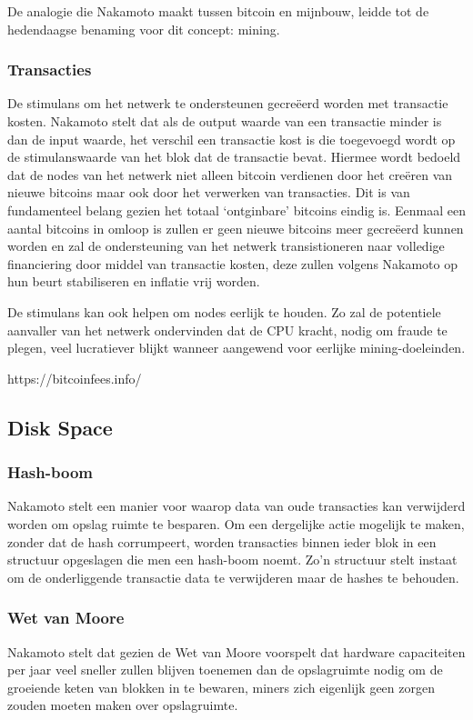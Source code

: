 		De analogie die Nakamoto maakt tussen bitcoin en mijnbouw, leidde tot de hedendaagse benaming voor dit concept: mining. 
		
		\subsubsection{Transacties}
		De stimulans om het netwerk te ondersteunen gecreëerd worden met transactie kosten. Nakamoto stelt dat als de output waarde van een transactie minder is dan de input waarde, het verschil een transactie kost is die toegevoegd wordt op de stimulanswaarde van het blok dat de transactie bevat. Hiermee wordt bedoeld dat de nodes van het netwerk niet alleen bitcoin verdienen door het creëren van nieuwe bitcoins maar ook door het verwerken van transacties. Dit is van fundamenteel belang gezien het totaal ‘ontginbare’ bitcoins eindig is. Eenmaal een aantal bitcoins in omloop is zullen er geen nieuwe bitcoins meer gecreëerd kunnen worden en zal de ondersteuning van het netwerk transistioneren naar volledige financiering door middel van transactie kosten, deze zullen volgens Nakamoto op hun beurt stabiliseren en inflatie vrij worden.
		
		De stimulans kan ook helpen om nodes eerlijk te houden. Zo zal de potentiele aanvaller van het netwerk ondervinden dat de CPU kracht, nodig om fraude te plegen, veel lucratiever blijkt wanneer aangewend voor eerlijke mining-doeleinden. 
		
		https://bitcoinfees.info/
		
	\subsection{Disk Space}
	\subsubsection{Hash-boom}
	Nakamoto stelt  een manier voor waarop data van oude transacties kan verwijderd worden om opslag ruimte te besparen. Om een dergelijke actie mogelijk te maken, zonder dat de hash corrumpeert, worden transacties binnen ieder blok in een structuur opgeslagen die men een hash-boom noemt. Zo’n structuur stelt instaat om de onderliggende transactie data te verwijderen maar de hashes te behouden. 
	\subsubsection{Wet van Moore}	
	Nakamoto stelt  dat gezien de Wet van Moore voorspelt dat hardware capaciteiten per jaar veel sneller zullen blijven toenemen dan de opslagruimte nodig om de groeiende keten van blokken in te bewaren, miners zich eigenlijk geen zorgen zouden moeten maken over opslagruimte.
